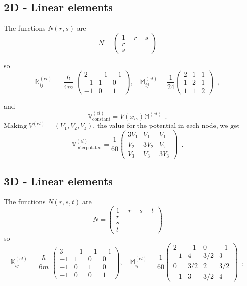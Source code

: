 \documentclass[12pt,letterpaper,final]{article}
\begin{document}
\subsection{2D - Linear elements}
The functions $N(r,s)$ are
\[ N =
   \!\left(
    \begin{array}{c}
      1-r-s \\
      r\\
      s
    \end{array}
    \right )\]

so
\[\mathbb{K}_{ij}^{(el)} = \frac{\hslash}{4m}  \begin{pmatrix}
  2 & -1 & -1 \\
  -1 & 1 & 0 \\
  -1 & 0 & 1  
 \end{pmatrix}, \quad \mathbb{M}_{ij}^{(el)} = \frac{1}{24}  \begin{pmatrix}
  2 & 1 & 1 \\
  1 & 2 & 1 \\
  1 & 1 & 2  
 \end{pmatrix} \enspace ,\]
 
and 
 \[\mathbb{V}_{\text{constant}}^{(el)} = V(x_m) \mathbb{M}^{(el)} \enspace .\]
Making ${V}^{(el)} = (V_1,V_2,V_3)$, the value for the potential in each node, we get
\[\mathbb{V}_{\text{interpolated}}^{(el)} = \frac{1}{60}  \begin{pmatrix}
  3V_1 & V_1 & V_1 \\
  V_2  & 3V_2 & V_2 \\
  V_3  & V_3 & 3V_3 
 \end{pmatrix} \enspace .\]
 
\subsection{3D - Linear elements} 
The functions $N(r,s,t)$ are
\[ N =
 \left(
   \begin{array}{c}
      1-r-s-t \\
      r\\
      s\\
      t
  \end{array}
\right )\]
so
\[\mathbb{K}_{ij}^{(el)} = \frac{\hslash}{6m}  \begin{pmatrix}
  3 & -1 & -1 & -1 \\
  -1 & 1 & 0 & 0 \\
  -1 & 0 & 1 & 0  \\
  -1 & 0 & 0 & 1
 \end{pmatrix}, \quad \mathbb{M}_{ij}^{(el)} = \frac{1}{60}  \begin{pmatrix}
  2 & -1 & 0 & -1 \\
  -1 & 4 & 3/2 & 3 \\
  0 & 3/2 & 2 & 3/2 \\
  -1 & 3 & 3/2 & 4 
 \end{pmatrix} \enspace ,\] 
 
\end{document}
